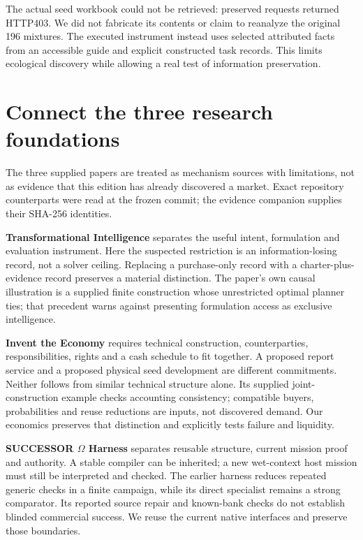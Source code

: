 \documentclass[11pt]{article}
\begin{document}
The actual seed workbook could not be retrieved: preserved requests returned HTTP403. We did not fabricate its contents or claim to reanalyze the original 196 mixtures. The executed instrument instead uses selected attributed facts from an accessible guide and explicit constructed task records. This limits ecological discovery while allowing a real test of information preservation.\cite{dataset,xerces}

\section{Connect the three research foundations}
The three supplied papers are treated as mechanism sources with limitations, not as evidence that this edition has already discovered a market. Exact repository counterparts were read at the frozen commit; the evidence companion supplies their SHA-256 identities.\cite{ti,economy,successor}

\textbf{Transformational Intelligence} separates the useful intent, formulation and evaluation instrument. Here the suspected restriction is an information-losing record, not a solver ceiling. Replacing a purchase-only record with a charter-plus-evidence record preserves a material distinction. The paper's own causal illustration is a supplied finite construction whose unrestricted optimal planner ties; that precedent warns against presenting formulation access as exclusive intelligence.\cite{ti}

\textbf{Invent the Economy} requires technical construction, counterparties, responsibilities, rights and a cash schedule to fit together. A proposed report service and a proposed physical seed development are different commitments. Neither follows from similar technical structure alone. Its supplied joint-construction example checks accounting consistency; compatible buyers, probabilities and reuse reductions are inputs, not discovered demand. Our economics preserves that distinction and explicitly tests failure and liquidity.\cite{economy}

\textbf{SUCCESSOR $\Omega$ Harness} separates reusable structure, current mission proof and authority. A stable compiler can be inherited; a new wet-context host mission must still be interpreted and checked. The earlier harness reduces repeated generic checks in a finite campaign, while its direct specialist remains a strong comparator. Its reported source repair and known-bank checks do not establish blinded commercial success. We reuse the current native interfaces and preserve those boundaries.\cite{successor}
\end{document}

